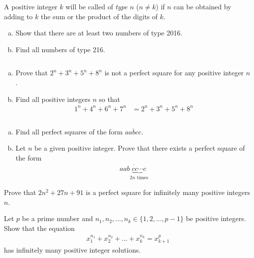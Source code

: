 \begin{problem}
	A positive integer $k$ will be called of \textit{type $n$} ($n \neq k$) if $n$ can be obtained by adding to $k$ the sum or the product of the digits of $k$.
	\begin{enumerate}[(a)]
		\item Show that there are at least two numbers of type 2016.
		\item  Find all numbers of type 216.
	\end{enumerate}
\end{problem}

\begin{problem}
	$ $
	\begin{enumerate}[(a)]
		\item Prove that $2^n+3^n+5^n+8^n$ is not a perfect square for any positive integer $n$.
		\item Find all positive integers $n$ so that
			\begin{align*}
				1^n + 4^n + 6^n + 7^n
					& = 2^n + 3^n + 5^n + 8^n
			\end{align*}
	\end{enumerate}
\end{problem}

\begin{problem}
	$ $
	\begin{enumerate}[(a)]
		\item Find all perfect squares of the form $\overline{aabcc}$.
		\item Let $n$ be a given positive integer. Prove that there exists a perfect square of the form
			\begin{align*}
				\overline{aab\underbrace{cc\cdots c}_{2n\text{ times}}}
			\end{align*}
	\end{enumerate}
\end{problem}

\begin{problem}
	Prove that $2n^2 + 27n + 91$ is a perfect square for infinitely many positive integers $n$.
\end{problem}

\begin{problem}
	Let $p$ be a prime number and $n_1, n_2, \dots, n_k \in \{1, 2, \dots, p -1\}$ be positive integers. Show that the equation
		\begin{align*}
			x_1^{n_1} + x_2^{n_2} + \dots + x_k^{n_k} = x_{k+1}^p
		\end{align*}
	has infinitely many positive integer solutions.
\end{problem}

